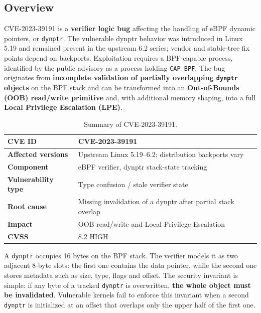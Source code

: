 \documentclass[../main.tex]{subfiles}
\begin{document}
\subsection{Overview}

CVE-2023-39191 is a \textbf{verifier logic bug} affecting the handling of eBPF dynamic pointers, or \texttt{dynptr}. The vulnerable dynptr behavior was introduced in Linux 5.19 and remained present in the upstream 6.2 series; vendor and stable-tree fix points depend on backports. Exploitation requires a BPF-capable process, identified by the public advisory as a process holding \texttt{CAP\_BPF}. The bug originates from \textbf{incomplete validation of partially overlapping \texttt{dynptr} objects} on the BPF stack and can be transformed into an \textbf{Out-of-Bounds (OOB) read/write primitive} and, with additional memory shaping, into a full \textbf{Local Privilege Escalation (LPE)}.

\begin{table}[H]
\centering
\begin{tabularx}{\textwidth}{|l|X|}
\hline
\textbf{CVE ID} & CVE-2023-39191 \\
\hline
\textbf{Affected versions} & Upstream Linux 5.19--6.2; distribution backports vary \\
\hline
\textbf{Component} & eBPF verifier, dynptr stack-state tracking \\
\hline
\textbf{Vulnerability type} & Type confusion / stale verifier state \\
\hline
\textbf{Root cause} & Missing invalidation of a dynptr after partial stack overlap \\
\hline
\textbf{Impact} & OOB read/write and Local Privilege Escalation \\
\hline
\textbf{CVSS} & 8.2 HIGH \\
\hline
\end{tabularx}
\caption{Summary of CVE-2023-39191.}
\end{table}

A \texttt{dynptr} occupies 16 bytes on the BPF stack. The verifier models it as two adjacent 8-byte slots: the first one contains the data pointer, while the second one stores metadata such as size, type, flags and offset. The security invariant is simple: if any byte of a tracked \texttt{dynptr} is overwritten, \textbf{the whole object must be invalidated}. Vulnerable kernels fail to enforce this invariant when a second \texttt{dynptr} is initialized at an offset that overlaps only the upper half of the first one.
\end{document}
